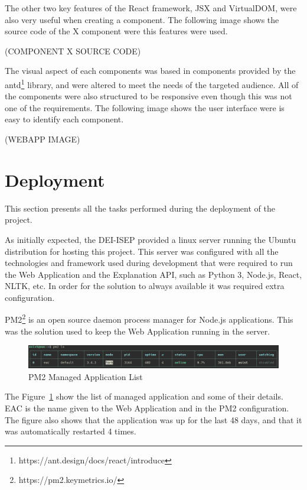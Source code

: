 The other two key features of the React framework, JSX and VirtualDOM, were also very useful when creating a component.
The following image shows the source code of the X component were this features were used. %

(COMPONENT X SOURCE CODE) %

The visual aspect of each components was based in components provided by the antd\footnote{https://ant.design/docs/react/introduce} library, and were altered to meet the needs of the targeted audience.
All of the components were also structured to be responsive even though this was not one of the requirements.
The following image shows the user interface were is easy to identify each component.

(WEBAPP IMAGE) %

\section{Deployment}

This section presents all the tasks performed during the deployment of the project.

As initially expected, the DEI-ISEP provided a linux server running the Ubuntu distribution for hosting this project.
This server was configured with all the technologies and framework used during development that were required to run the Web Application and the Explanation API, such as Python 3, Node.js, React, NLTK, etc.
In order for the solution to always available it was required extra configuration.

PM2\footnote{https://pm2.keymetrics.io/} is an open source daemon process manager for Node.js applications.
This was the solution used to keep the Web Application running in the server.

\begin{figure}[H]
\centering
\includegraphics[width=\textwidth,keepaspectratio]{ch5/assets/pm2ls.png}
\caption[PM2 Managed Application List]{PM2 Managed Application List}
\label{fig:pm2}
\end{figure}

The Figure~\ref{fig:pm2} show the list of managed application and some of their details.
EAC is the name given to the Web Application and in the PM2 configuration.
The figure also shows that the application was up for the last 48 days, and that it was automatically restarted 4 times.

